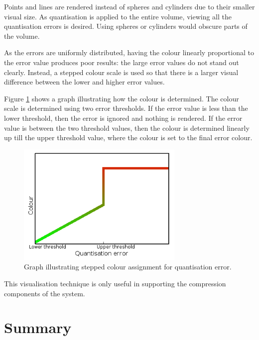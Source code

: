 Points and lines are rendered instead of spheres and cylinders due to their
smaller visual size. As quantisation is applied to the entire volume, viewing
all the quantisation errors is desired. Using spheres or cylinders would
obscure parts of the volume.

As the errors are uniformly distributed, having the colour linearly
proportional to the error value produces poor results: the large error values
do not stand out clearly. Instead, a stepped colour scale is used so that there
is a larger visual difference between the lower and higher error values.

Figure \ref{fig:design_quantgraph} shows a graph illustrating how the colour is
determined. The colour scale is determined using two error thresholds. If the
error value is less than the lower threshold, then the error is ignored and
nothing is rendered. If the error value is between the two threshold values,
then the colour is determined linearly up till the upper threshold value, where
the colour is set to the final error colour.

\begin{figure}
  \begin{center}
    \includegraphics[width=80mm]{quant_colour_graph}
  \end{center}
  \caption{Graph illustrating stepped colour assignment for quantisation error.}
  \label{fig:design_quantgraph}
\end{figure}

This visualisation technique is only useful in supporting the compression
components of the system.



\section{Summary}
\label{sec:design_summary}

